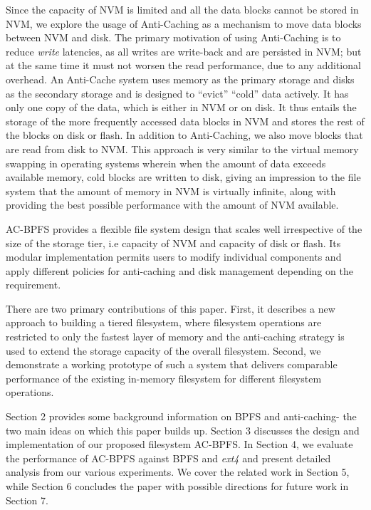 Since the capacity of NVM is limited and all the data blocks cannot be stored in NVM, we explore the usage of Anti-Caching \cite{c13} as a mechanism to move data blocks between NVM and disk. The primary motivation of using Anti-Caching is to reduce \textit{write} latencies, as all writes are write-back and are persisted in NVM; but at the same time it must not worsen the read performance, due to any additional overhead. An Anti-Cache system uses memory as the primary storage and disks as the secondary storage and is designed to “evict” “cold” data actively. It has only one copy of the data, which is either in NVM or on disk. It thus entails the storage of the more frequently accessed data blocks in NVM and stores the rest of the blocks on disk or flash. In addition to Anti-Caching, we also move blocks that are read from disk to NVM. This approach is very similar to the virtual memory swapping in operating systems wherein when the amount of data exceeds available memory, cold blocks are written to disk, giving an impression to the file system that the amount of memory in NVM is virtually infinite, along with providing the best possible performance with the amount of NVM available.

AC-BPFS provides a flexible file system design that scales well irrespective of the size of the storage tier, i.e capacity of NVM and capacity of disk or flash. Its modular implementation permits users to modify individual components and apply different policies for anti-caching and disk management depending on the requirement.

There are two primary contributions of this paper. First, it describes a new approach to building a tiered filesystem, where  filesystem operations are restricted to only the fastest layer of memory and the anti-caching strategy is used to extend the storage capacity of the overall filesystem. Second, we demonstrate a working prototype of such a system that delivers comparable performance of the existing in-memory filesystem for different filesystem operations.

Section 2 provides some background information on BPFS and anti-caching- the two main ideas on which this paper builds up. Section 3 discusses the design and implementation of our proposed filesystem AC-BPFS. In Section 4, we evaluate the performance of AC-BPFS against BPFS and \textit{ext4} and present detailed analysis from our various experiments. We cover the related work in Section 5, while Section 6 concludes the paper with possible directions for future work in Section 7.
